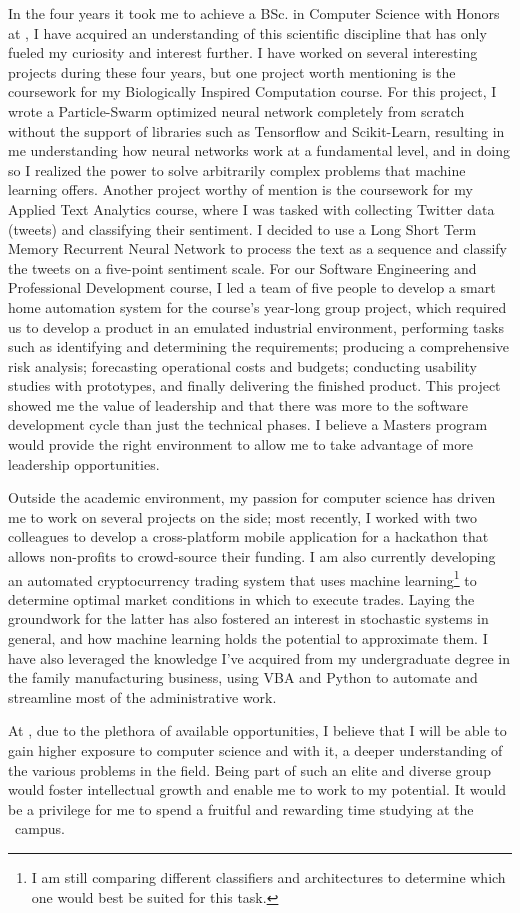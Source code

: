 \documentclass[a4paper,11pt]{article}
\begin{document}
In the four years it took me to achieve a BSc. in Computer Science with Honors at \hw, I have acquired an understanding of this scientific discipline that has only fueled my curiosity and interest further. I have worked on several interesting projects during these four years, but one project worth mentioning is the coursework for my Biologically Inspired Computation course. For this project, I wrote a Particle-Swarm optimized neural network completely from scratch without the support of libraries such as Tensorflow and Scikit-Learn, resulting in me understanding how neural networks work at a fundamental level, and in doing so I realized the power to solve arbitrarily complex problems that machine learning offers. Another project worthy of mention is the coursework for my Applied Text Analytics course, where I was tasked with collecting Twitter data (tweets) and classifying their sentiment.  I decided to use a Long Short Term Memory Recurrent Neural Network to process the text as a sequence and classify the tweets on a five-point sentiment scale.  For our Software Engineering and Professional Development course, I led a team of five people to develop a smart home automation system for the course's year-long group project, which required us to develop a product in an emulated industrial environment,  performing tasks such as identifying and determining the requirements; producing a comprehensive risk analysis; forecasting operational costs and budgets; conducting usability studies with prototypes, and finally delivering the finished product. This project showed me the value of leadership and that there was more to the software development cycle than just the technical phases. I believe a Masters program would provide the right environment to allow me to take advantage of more leadership opportunities.

Outside the academic environment, my passion for computer science has driven me to work on several projects on the side; most recently, I worked with two colleagues to develop a cross-platform mobile application for a hackathon that allows non-profits to crowd-source their funding. I am also currently developing an automated cryptocurrency trading system that uses machine learning\footnote{I am still comparing different classifiers and architectures to determine which one would best be suited for this task.} to determine optimal market conditions in which to execute trades.  Laying the groundwork for the latter has also fostered an interest in stochastic systems in general, and how machine learning holds the potential to approximate them. I have also leveraged the knowledge I've acquired from my undergraduate degree in the family manufacturing business, using VBA and Python to automate and streamline most of the administrative work.

At \uni, due to the plethora of available opportunities, I believe that I will be able to gain higher exposure to computer science and with it, a deeper understanding of the various problems in the field. Being part of such an elite and diverse group would foster intellectual growth and enable me to work to my potential. It would be a privilege for me to spend a fruitful and rewarding time studying at the \city\ campus.

\printbibliography
\end{document}
